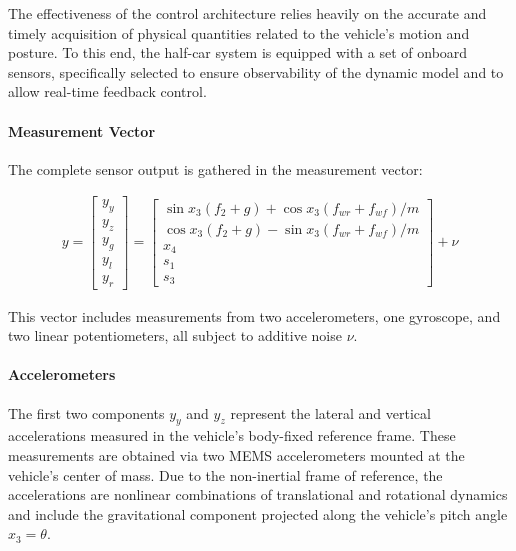\documentclass[]{report}
\begin{document}
	The effectiveness of the control architecture relies heavily on the accurate and timely acquisition of physical quantities related to the vehicle's motion and posture. To this end, the half-car system is equipped with a set of onboard sensors, specifically selected to ensure observability of the dynamic model and to allow real-time feedback control.
	
	\paragraph{Measurement Vector}
	The complete sensor output is gathered in the measurement vector:
	
	\begin{align}
		y = \begin{bmatrix}
			y_y \\ y_z \\ y_g \\ y_l \\ y_r
		\end{bmatrix} =
		\begin{bmatrix}
			\sin x_3(f_2 + g) + \cos x_3(f_{wr} + f_{wf})/m \\
			\cos x_3(f_2 + g) - \sin x_3(f_{wr} + f_{wf})/m \\
			x_4 \\
			s_1 \\
			s_3
		\end{bmatrix} + \nu
	\end{align}
	
	This vector includes measurements from two accelerometers, one gyroscope, and two linear potentiometers, all subject to additive noise $\nu$.
	
	\paragraph{Accelerometers}
	The first two components $y_y$ and $y_z$ represent the lateral and vertical accelerations measured in the vehicle’s body-fixed reference frame. These measurements are obtained via two MEMS accelerometers mounted at the vehicle's center of mass. Due to the non-inertial frame of reference, the accelerations are nonlinear combinations of translational and rotational dynamics and include the gravitational component projected along the vehicle's pitch angle $x_3 = \theta$.
	
\end{document}
